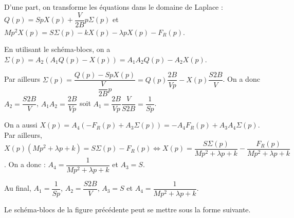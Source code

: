 \fi
{}
\ifprof
\begin{corrige}
D'une part, on transforme les équations dans le domaine de Laplace : 
$Q(p)=S p X(p)+\dfrac{V}{2B} p \Sigma(p)$ et
$Mp^2 X(p) = S \Sigma(p) - kX(p)-\lambda p X(p) - F_R(p)$.

En utilisant le schéma-blocs, on a $\Sigma(p)=A_2\left(A_1Q(p)-X(p)\right) = A_1A_2Q(p)-A_2X(p)$.

Par ailleurs $\Sigma(p)=\dfrac{Q(p)-S p X(p)}{\dfrac{V}{2B} p}= Q(p)\dfrac{2B}{Vp}-  X(p)  \dfrac{S2B}{V} $. On a donc $A_2 = \dfrac{S2B}{V} $, $A_1 A_2 = \dfrac{2B}{Vp}$ soit $A_1  = \dfrac{2B}{Vp}\dfrac{V}{S2B}= \dfrac{1}{Sp}$. 


On a aussi $X(p)=A_4\left(-F_R(p)+A_3\Sigma(p)\right) =-A_4F_R(p)+A_3A_4\Sigma(p)$. Par ailleurs,
$X(p) \left(Mp^2  +\lambda p  + k\right)= S \Sigma(p) - F_R(p) \Leftrightarrow X(p) =  \dfrac{S \Sigma(p)}{Mp^2  +\lambda p  + k}-\dfrac{F_R(p)}{Mp^2  +\lambda p  + k}$. On a donc : $A_4 = \dfrac{1}{Mp^2  +\lambda p  + k}$ et $A_3 = S$.

Au final,  $A_1=\dfrac{1}{Sp}$,  $A_2 = \dfrac{S2B}{V} $,  $A_3 = S$  et $A_4 = \dfrac{1}{Mp^2  +\lambda p  + k}$.
\end{corrige}
\else
\fi

\ifprof
\else

Le schéma-blocs de la figure précédente peut se mettre sous la forme suivante. 

\begin{marginfigure}
\footnotesize
\begin{center}
\end{center}
\normalsize
\end{marginfigure}
\fi

